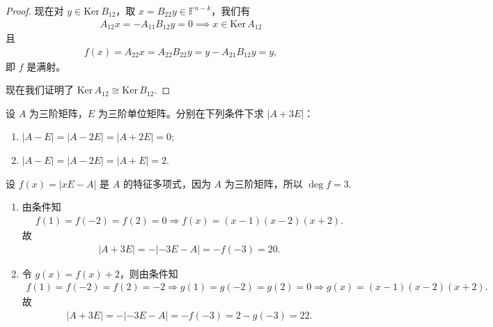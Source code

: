 \documentclass[../../main.tex]{subfiles}%
\begin{document}
\begin{proof}
现在对 $y \in \text{Ker}\, B_{12}$，取 $x = B_{22}y \in \mathbb{F}^{n-k}$，我们有
\begin{align*}
A_{12}x = -A_{11}B_{12}y = 0 \implies x \in \text{Ker}\, A_{12}
\end{align*}
且
\begin{align*}
f(x) = A_{22}x = A_{22}B_{22}y = y - A_{21}B_{12}y = y,
\end{align*}
即 $f$ 是满射。

现在我们证明了 $\text{Ker}\, A_{12} \cong \text{Ker}\, B_{12}$.
\end{proof}

\begin{example}
设 $A$ 为三阶矩阵，$E$ 为三阶单位矩阵。分别在下列条件下求 $|A + 3E|$：
\begin{enumerate}[(1)]
\item $|A - E| = |A - 2E| = |A + 2E| = 0$;
\item $|A - E| = |A - 2E| = |A + E| = 2$.
\end{enumerate}
\end{example}
\begin{solution}
设 $f(x)=|xE-A|$ 是 $A$ 的特征多项式，因为 $A$ 为三阶矩阵，所以 $\deg f=3$.
\begin{enumerate}[(1)]
\item 由条件知
\begin{align*}
f(1)=f(-2)=f(2)=0 \Longrightarrow f(x)=(x-1)(x-2)(x+2).
\end{align*}
故
\begin{align*}
|A+3E|=-|-3E-A|=-f(-3)=20.
\end{align*}

\item 令 $g(x)=f(x)+2$，则由条件知
\begin{align*}
f(1)=f(-2)=f(2)=-2 \Longrightarrow g(1)=g(-2)=g(2)=0 \Longrightarrow g(x)=(x-1)(x-2)(x+2).
\end{align*}
故
\begin{align*}
|A+3E|=-|-3E-A|=-f(-3)=2-g(-3)=22.
\end{align*}
\end{enumerate}
\end{solution}
\end{document}
